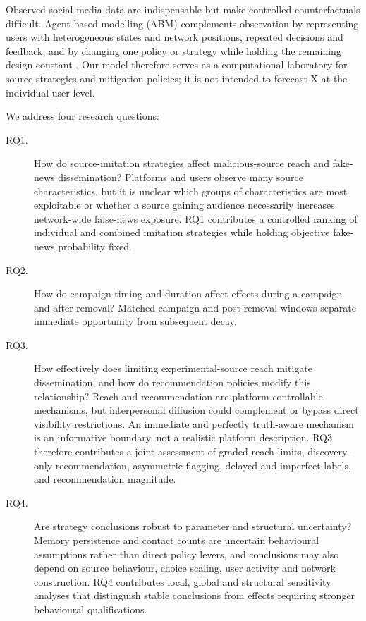 Observed social-media data are indispensable but make controlled counterfactuals difficult. Agent-based modelling (ABM) complements observation by representing users with heterogeneous states and network positions, repeated decisions and feedback, and by changing one policy or strategy while holding the remaining design constant \citep{macal2010,grimm2020}. Our model therefore serves as a computational laboratory for source strategies and mitigation policies; it is not intended to forecast X at the individual-user level.

We address four research questions:

\begin{description}
\item[RQ1.] How do source-imitation strategies affect malicious-source reach and fake-news dissemination? Platforms and users observe many source characteristics, but it is unclear which groups of characteristics are most exploitable or whether a source gaining audience necessarily increases network-wide false-news exposure. RQ1 contributes a controlled ranking of individual and combined imitation strategies while holding objective fake-news probability fixed.
\item[RQ2.] How do campaign timing and duration affect effects during a campaign and after removal? Matched campaign and post-removal windows separate immediate opportunity from subsequent decay.
\item[RQ3.] How effectively does limiting experimental-source reach mitigate dissemination, and how do recommendation policies modify this relationship? Reach and recommendation are platform-controllable mechanisms, but interpersonal diffusion could complement or bypass direct visibility restrictions. An immediate and perfectly truth-aware mechanism is an informative boundary, not a realistic platform description. RQ3 therefore contributes a joint assessment of graded reach limits, discovery-only recommendation, asymmetric flagging, delayed and imperfect labels, and recommendation magnitude.
\item[RQ4.] Are strategy conclusions robust to parameter and structural uncertainty? Memory persistence and contact counts are uncertain behavioural assumptions rather than direct policy levers, and conclusions may also depend on source behaviour, choice scaling, user activity and network construction. RQ4 contributes local, global and structural sensitivity analyses that distinguish stable conclusions from effects requiring stronger behavioural qualifications.
\end{description}

